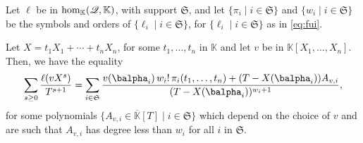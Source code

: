\documentclass[12pt]{article}
\newcommand{\lf}{X}
\newcommand{\residueI}{\mathscr{Q}}
\def\K{\mathbb{K}}
\def\K {\ensuremath{\mathbb{K}}}
\def\Kbar {{\ensuremath{\overline{\mathbb{K}}}}}
\begin{document}
\begin{lemma}\label{lemma:formula}
  Let $\ell$ be in ${\rm hom}_\K(\residueI,\K)$, with support $\mathfrak{S}$,
  and let $\{\pi_i \mid i \in \mathfrak{S}\}$ and $\{w_i \mid i \in
  \mathfrak{S}\}$ be the symbols and orders of $\{\ell_i \mid i \in \mathfrak{S}\}$,
  for $\{\ell_i \mid i \in \mathfrak{S}\}$ as in \cref{eq:fui}.
	
  Let $\lf=t_1 X_1 + \cdots +t_n X_n$, for some $t_1,\dots,t_n$ in $\K$
  and let $v$ be in $\K[X_1,\dots,X_n]$. Then, we have the equality
  \begin{align}\label{eq:sumgenseries}
    \sum_{s \ge 0} \frac{\ell(v \lf^s)}{T^{s+1}} = \sum_{i \in \mathfrak{S}}
    \frac{ v(\balpha_i)\, w_i!\, \pi_{i}(t_1,\dots,t_n) +
      (T-\lf(\balpha_i))A_{v,i}} {(T-\lf(\balpha_i))^{w_{i}+1}},
  \end{align}
  for some polynomials $\{A_{v,i} \in \Kbar[T] \mid i \in \mathfrak{S}\}$ which
  depend on the choice of $v$ and are such that $A_{v,i}$ has degree less than
  $w_i$ for all $i$ in $\mathfrak{S}$.
\end{lemma}
\end{document}
